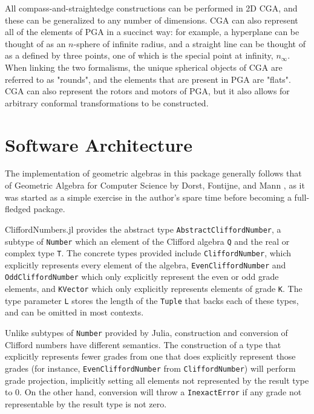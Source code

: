 \documentclass{juliacon}
\begin{document}
All compass-and-straightedge constructions can be performed in 2D CGA, and these can be generalized to any number of dimensions. CGA can also represent all of the elements of PGA in a succinct way:
for example, a hyperplane can be thought of as an $n$-sphere of infinite radius, and a straight line can be thought of as a defined by three points, one of which is the special point at infinity, $n_\infty$.
When linking the two formalisms, the unique spherical objects of CGA are referred to as "rounds", and the elements that are present in PGA are "flats". CGA can also represent the rotors and motors of PGA, but it also allows for arbitrary conformal transformations to be constructed.

\section{Software Architecture}

The implementation of geometric algebras in this package generally follows that of Geometric Algebra for Computer Science by Dorst, Fontijne, and Mann \cite{dorst_geometric_2010}, as it was started as a simple exercise in the author's spare time before becoming a full-fledged package.

CliffordNumbers.jl provides the abstract type \texttt{AbstractCliffordNumber}, a subtype of \texttt{Number} which an element of the Clifford algebra \texttt{Q} and the real or complex type \texttt{T}.
The concrete types provided include \texttt{CliffordNumber}, which explicitly represents every element of the algebra, \texttt{EvenCliffordNumber} and \texttt{OddCliffordNumber} which only explicitly represent the even or odd grade elements, and \texttt{KVector} which only explicitly represents elements of grade \texttt{K}.
The type parameter \texttt{L} stores the length of the \texttt{Tuple} that backs each of these types, and can be omitted in most contexts.

Unlike subtypes of \texttt{Number} provided by Julia, construction and conversion of Clifford numbers have different semantics.
The construction of a type that explicitly represents fewer grades from one that does explicitly represent those grades (for instance, \texttt{EvenCliffordNumber} from \texttt{CliffordNumber}) will perform grade projection, implicitly setting all elements not represented by the result type to 0.
On the other hand, conversion will throw a \texttt{InexactError} if any grade not representable by the result type is not zero.
\end{document}
